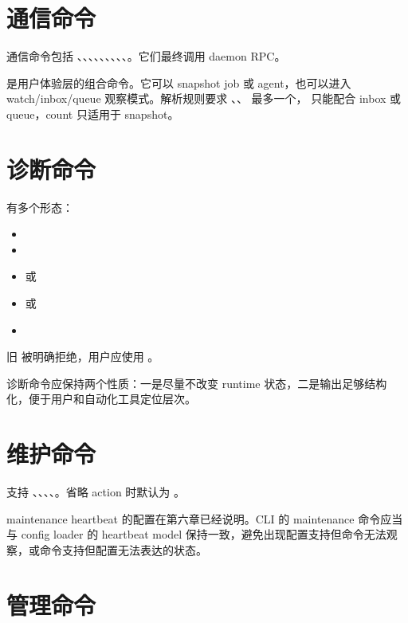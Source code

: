 \section{通信命令}

通信命令包括 、、、、、、、、、。它们最终调用 daemon RPC。

 是用户体验层的组合命令。它可以 snapshot job 或 agent，也可以进入 watch/inbox/queue 观察模式。解析规则要求 、、 最多一个， 只能配合 inbox 或 queue，count 只适用于 snapshot。

\section{诊断命令}

 有多个形态：

\begin{itemize}
  \item {}
  \item {}
  \item {} 或 
  \item {} 或 
  \item {}
\end{itemize}

旧  被明确拒绝，用户应使用 。

诊断命令应保持两个性质：一是尽量不改变 runtime 状态，二是输出足够结构化，便于用户和自动化工具定位层次。

\section{维护命令}

 支持 、、、、。省略 action 时默认为 。

maintenance heartbeat 的配置在第六章已经说明。CLI 的 maintenance 命令应当与 config loader 的 heartbeat model 保持一致，避免出现配置支持但命令无法观察，或命令支持但配置无法表达的状态。

\section{管理命令}

